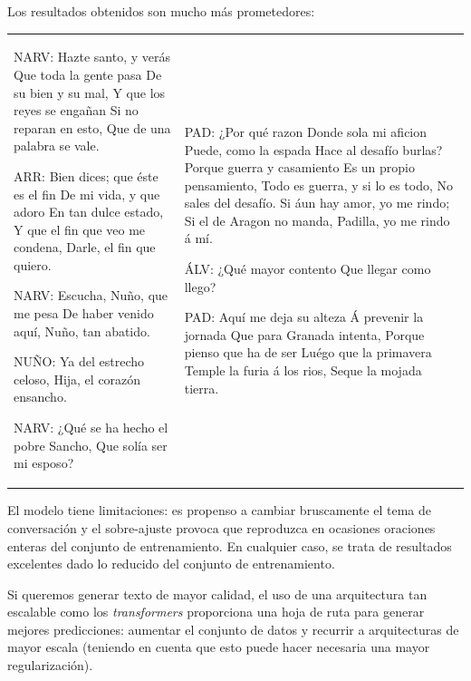 Los resultados obtenidos son mucho más prometedores:
\noindent
\begin{table}[H]
  \centering
  \begin{tabular}{ l | l }
  \begin{Code}
    NARV:
    Hazte santo, y verás
    Que toda la gente pasa
    De su bien y su mal,
    Y que los reyes se engañan
    Si no reparan en esto,
    Que de una palabra se vale.
    
    ARR:
    Bien dices; que éste es el fin
    De mi vida, y que adoro
    En tan dulce estado,
    Y que el fin que veo me condena,
    Darle, el fin que quiero.    

    NARV:
    Escucha, Nuño, que me pesa
    De haber venido aquí,
    Nuño, tan abatido.

    NUÑO:
    Ya del estrecho celoso,
    Hija, el corazón ensancho.

    NARV:
    ¿Qué se ha hecho el pobre Sancho,
    Que solía ser mi esposo?
  \end{Code} 
  &
  \begin{Code}
    PAD:
    ¿Por qué razon
    Donde sola mi aficion
    Puede, como la espada
    Hace al desafío burlas?
    Porque guerra y casamiento
    Es un propio pensamiento,
    Todo es guerra, y si lo es todo,
    No sales del desafío.
    Si áun hay amor, yo me rindo;
    Si el de Aragon no manda,
    Padilla, yo me rindo á mí.
    
    ÁLV:
    ¿Qué mayor contento
    Que llegar como llego?
    
    PAD:
    Aquí me deja su alteza
    Á prevenir la jornada
    Que para Granada intenta,
    Porque pienso que ha de ser
    Luégo que la primavera
    Temple la furia á los rios,
    Seque la mojada tierra.  
  \end{Code}
\end{tabular}
\end{table}

El modelo tiene limitaciones: es propenso a cambiar bruscamente el tema de conversación y el sobre-ajuste provoca que reproduzca en ocasiones oraciones enteras del conjunto de entrenamiento. En cualquier caso, se trata de resultados excelentes dado lo reducido del conjunto de entrenamiento.

Si queremos generar texto de mayor calidad, el uso de una arquitectura tan escalable como los \textit{transformers} proporciona una hoja de ruta para generar mejores predicciones: aumentar el conjunto de datos y recurrir a arquitecturas de mayor escala (teniendo en cuenta que esto puede hacer necesaria una mayor regularización).

